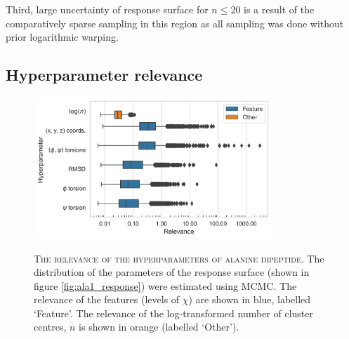 Third, large uncertainty of response surface for $n \leq 20$ is a result of the comparatively sparse sampling in this region as all sampling was done without prior logarithmic warping. 
 
\subsection{Hyperparameter relevance}\label{subsubsec:ala_relevance}

\begin{figure}
    \centering
    \caption[The relevance of the hyperparameters of alanine dipeptide]{\textsc{The relevance of the hyperparameters of alanine dipeptide}. The distribution of the parameters of the response surface (shown in figure \ref{fig:ala1_response}) were estimated using MCMC. The relevance of the features (levels of $\chi$) are shown in blue, labelled `Feature'. The relevance of the log-transformed number of cluster centres, $n$ is shown in orange (labelled `Other').}
    \includegraphics[width=0.8\textwidth]{chapters/msm_optimization/figures/ala1_relevance.png}
    \label{fig:ala1_relevance}
\end{figure}

